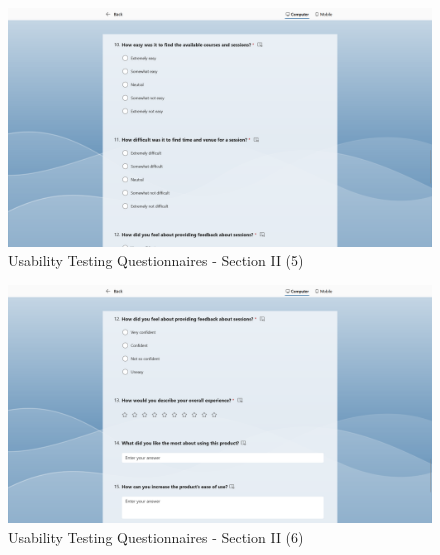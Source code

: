 \begin{justify}
\begin{figure}[H]
    \centerline{\includegraphics[width=150mm,scale=1]{figures/implementation_and_testing/testing/MUT/questions/Questions (7).png}}
    \caption{Usability Testing Questionnaires - Section II (5)}
    \label{Usability Testing Questionnaires - Section II (5)}
\end{figure}

\begin{figure}[H]
    \centerline{\includegraphics[width=150mm,scale=1]{figures/implementation_and_testing/testing/MUT/questions/Questions (8).png}}
    \caption{Usability Testing Questionnaires - Section II (6)}
    \label{Usability Testing Questionnaires - Section II (6)}
\end{figure}


\end{justify}

